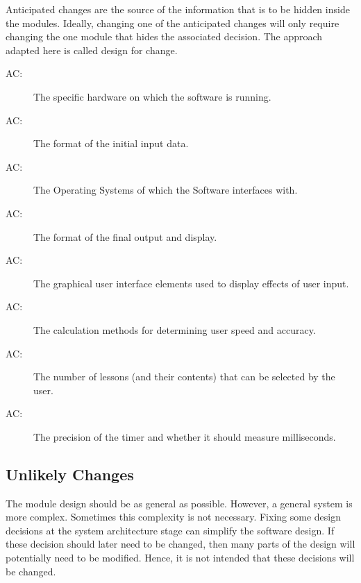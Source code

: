 \documentclass[12pt, titlepage]{article}
\newcounter{acnum}
\newcommand{\actheacnum}{AC\theacnum}
\begin{document}
Anticipated changes are the source of the information that is to be hidden
inside the modules. Ideally, changing one of the anticipated changes will only
require changing the one module that hides the associated decision. The approach
adapted here is called design for
change.

\begin{description}
\item[ \actheacnum \label{acHardware}:] The specific hardware on which the software is running.
\item[ \actheacnum \label{acInput}:] The format of the initial input data.
\item[ \actheacnum \label{acOS}:] The Operating Systems of which the Software interfaces with.
 \item[ \actheacnum \label{acFinalOutput}:] The format of the final output and display.
 \item[ \actheacnum \label{acGUI}:] The graphical user interface elements used to display effects of user input.
 \item[ \actheacnum \label{acCalculations}:] The calculation methods for determining user speed and accuracy.
  \item[ \actheacnum \label{acLessons}:] The number of lessons (and their contents) that can be selected by the user.
   \item[ \actheacnum \label{acTimer}:] The precision of the timer and whether it should measure milliseconds.
\end{description}

\subsection{Unlikely Changes} \label{SecUchange}

The module design should be as general as possible. However, a general system is
more complex. Sometimes this complexity is not necessary. Fixing some design
decisions at the system architecture stage can simplify the software design. If
these decision should later need to be changed, then many parts of the design
will potentially need to be modified. Hence, it is not intended that these
decisions will be changed.
\end{document}
